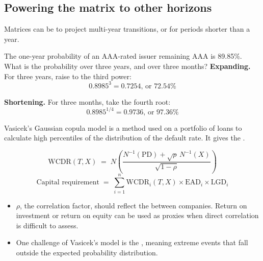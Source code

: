 \subsection*{Powering the matrix to other horizons}

Matrices can be  to project multi-year transitions, or
 for periods shorter than a year.

\begin{crexbox}
The one-year probability of an AAA-rated issuer remaining AAA is 89.85\%. What is
the probability over three years, and over three months?
\tcblower
\textbf{Expanding.} For three years, raise to the third power:
\[ 0.8985^{3} = 0.7254 \text{, or } 72.54\% \]

\textbf{Shortening.} For three months, take the fourth root:
\[ 0.8985^{1/4} = 0.9736 \text{, or } 97.36\% \]
\end{crexbox}


Vasicek's Gaussian copula model is a method used on a portfolio of loans to
calculate high percentiles of the distribution of the default rate. It gives the
.

\begin{crfmlbox}
\[ \mathrm{WCDR}(T,X) \;=\; N\!\left(\frac{N^{-1}(\mathrm{PD})
   + \sqrt{\rho}\,N^{-1}(X)}{\sqrt{1-\rho}}\right) \]
\[ \text{Capital requirement} \;=\; \sum_{i=1}^{n}
   \mathrm{WCDR}_i(T,X)\times \mathrm{EAD}_i \times \mathrm{LGD}_i \]
\end{crfmlbox}

\begin{itemize}
\item $\rho$, the correlation factor, should reflect the  between companies. Return on investment or return on equity can be
used as proxies when direct correlation is difficult to assess.
\item One challenge of Vasicek's model is the , meaning extreme events that fall outside the expected probability
distribution.
\end{itemize}

